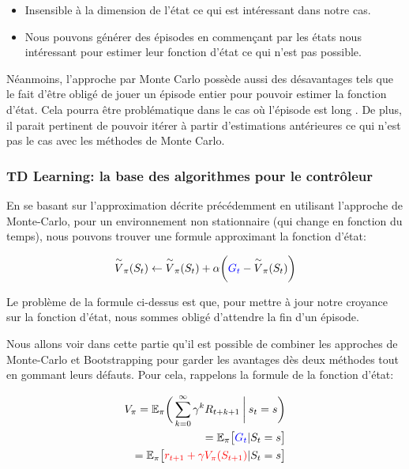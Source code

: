 \begin{itemize}
\item Insensible à la dimension de l'état ce qui est intéressant dans notre cas.
\item Nous pouvons générer des épisodes en commençant par les états nous intéressant pour estimer leur fonction d'état ce qui n'est pas possible.
\end{itemize}

Néanmoins, l'approche par Monte Carlo possède aussi des désavantages tels que le fait d'être obligé de jouer un épisode entier pour pouvoir estimer la fonction d'état. Cela pourra être problématique dans le cas où l'épisode est  long . De plus, il parait pertinent de pouvoir itérer à partir d'estimations antérieures ce qui n'est pas le cas avec les méthodes de Monte Carlo. 

\subsubsection{TD Learning: la base des algorithmes pour le contrôleur}
En se basant sur l'approximation décrite précédemment en utilisant l'approche de Monte-Carlo, pour un environnement non stationnaire (qui change en fonction du temps), nous pouvons trouver une formule approximant la fonction d'état:
 
 \begin{equation}
\overset{\sim}{V}_{\pi}(S_t) \leftarrow \overset{\sim}{V}_{\pi}(S_t) + \alpha \bigg(\textcolor{blue}{G_t} - \overset{\sim}{V}_{\pi}(S_t)\bigg)
\end{equation}
 
Le problème de la formule ci-dessus est que, pour mettre à jour notre croyance sur la fonction d'état, nous sommes obligé d'attendre la fin d'un épisode.

Nous allons voir dans cette partie qu'il est possible de combiner les approches de Monte-Carlo et Bootstrapping pour garder les avantages dès deux méthodes tout en gommant leurs défauts. Pour cela, rappelons la formule de la fonction d'état: 

\begin{align*}
V_{\pi} = \mathbb{E_\pi}\bigg(\sum_{k=0}^{\infty} \gamma^kR_{t+k+1} \:\bigg\vert\: s_t=s \bigg) \\
= \mathbb{E}_\pi \big[\textcolor{blue}{G_t} \vert S_t = s\big] \\
= \mathbb{E}_\pi \big[\textcolor{red}{r_{t+1} + \gamma V_{\pi}(S_{t+1})} \vert S_t = s\big]
\end{align*}
 
